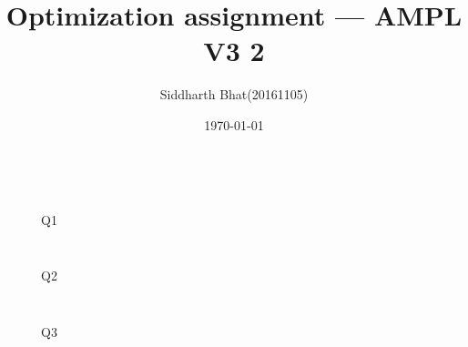 \documentclass[11pt]{article}
\author{Siddharth Bhat(20161105)}
\title{Optimization assignment --- AMPL V3 2}
\date{\today}
\begin{document}
\maketitle
\begin{figure}[!htb]
    \begin{minipage}{0.5\textwidth}
        \centering
        \inputminted[fontsize=\tiny]{ampl}{q1/solution.dat}
    \end{minipage}
    \begin{minipage}{0.5\textwidth}
        \centering
        \inputminted[fontsize=\tiny]{ampl}{q1/solution.mod}
    \end{minipage}
    \caption{Q1}
\end{figure}
\begin{figure}[!htb]
    \begin{minipage}{0.5\textwidth}
        \centering
        \inputminted[fontsize=\tiny]{ampl}{q2/solution.dat}
    \end{minipage}
    \begin{minipage}{0.5\textwidth}
        \centering
        \inputminted[fontsize=\tiny]{ampl}{q2/solution.mod}
    \end{minipage}
    \caption{Q2}
\end{figure}
\begin{figure}[!htb]
    \begin{minipage}{0.5\textwidth}
        \centering
        \inputminted[fontsize=\tiny]{ampl}{q3/solution.dat}
    \end{minipage}
    \begin{minipage}{0.5\textwidth}
        \centering
        \inputminted[fontsize=\tiny]{ampl}{q3/solution.mod}
    \end{minipage}
    \caption{Q3}
\end{figure}

\thispagestyle{fancy}
\end{document}
